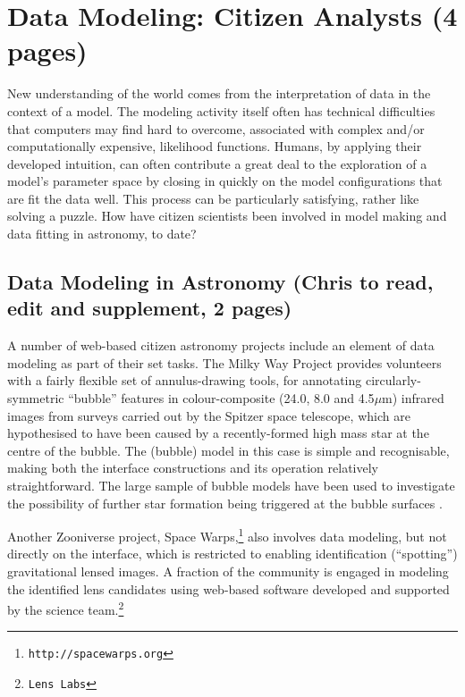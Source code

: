 \documentclass{ar2e}
\begin{document}
\section{Data Modeling: Citizen Analysts (4 pages)}
\label{sec:model}

New understanding of the world comes from the interpretation of data in the
context of a model. The modeling activity itself often has technical
difficulties that computers may find hard to overcome, associated with complex
and/or computationally expensive, likelihood functions. Humans, by applying
their developed intuition, can often contribute a great deal to the
exploration of a model's parameter space by closing in quickly on the model
configurations that are fit the data well. This process can be particularly
satisfying, rather like solving a puzzle. How have citizen scientists been
involved in model making and data fitting in astronomy, to date?



\subsection{Data Modeling in Astronomy (Chris to read, edit and supplement, 2 pages)}
\label{sec:model:astro}

A number of  web-based citizen astronomy projects include an element of data
modeling as part of their set tasks. The Milky Way Project
\citep{SimpsonEtal2012} provides volunteers with a fairly flexible set of
annulus-drawing tools, for annotating circularly-symmetric ``bubble'' features
in colour-composite (24.0, 8.0 and  4.5$\mu$m) infrared images from surveys
carried out by the Spitzer space telescope, which are hypothesised to have
been caused by a recently-formed high mass star at the centre of the bubble.
The (bubble) model in this case is simple and recognisable, making both the
interface constructions and its operation relatively straightforward. The
large sample of  bubble models have been used to investigate the possibility
of further star formation being triggered at the bubble surfaces
\citep{KendrewEtal2012}.

Another Zooniverse project, Space
Warps,\footnote{\texttt{http://spacewarps.org}} also involves data modeling,
but not directly on the interface, which is restricted to enabling
identification (``spotting'') gravitational lensed images. A fraction of the
community is engaged in modeling the  identified lens candidates using
web-based software developed and supported  by the science
team.\footnote{\texttt{Lens Labs}} 
\end{document}
